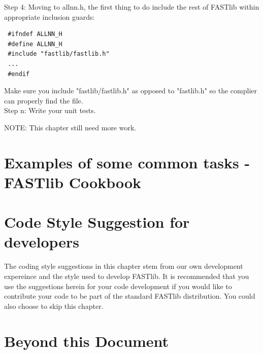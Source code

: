 \documentclass[letter]{report}
\begin{document}
Step 4: Moving to allnn.h, the first thing to do include the rest of FASTlib within appropriate inclusion guards: 

\begin{verbatim}
 #ifndef ALLNN_H
 #define ALLNN_H
 #include "fastlib/fastlib.h"
 ...
 #endif
\end{verbatim}

Make sure you include "fastlib/fastlib.h" as opposed to "fastlib.h" so the complier can properly find the file.\\ 

Step n: Write your unit tests. 

NOTE: This chapter still need more work.

\chapter {Examples of some common tasks - FASTlib Cookbook}

\chapter {Code Style Suggestion for developers}
The coding style suggestions in this chapter stem from our own development expereince and the style used to develop FASTlib. It is recommended that you use the suggestions herein for your code development if you would like to contribute your code to be part of the standard FASTlib distribution. You could also choose to skip this chapter.

\chapter {Beyond this Document} 
\end{document}
